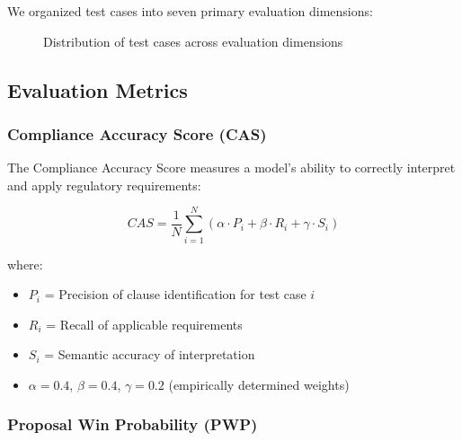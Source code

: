 \documentclass[11pt,a4paper]{article}
\begin{document}
We organized test cases into seven primary evaluation dimensions:

\begin{figure}[H]
\centering
{}
\caption{Distribution of test cases across evaluation dimensions}
\label{fig:testdist}
\end{figure}

\subsection{Evaluation Metrics}

\subsubsection{Compliance Accuracy Score (CAS)}

The Compliance Accuracy Score measures a model's ability to correctly interpret and apply regulatory requirements:

\begin{equation}
CAS = \frac{1}{N} \sum_{i=1}^{N} \left( \alpha \cdot P_i + \beta \cdot R_i + \gamma \cdot S_i \right)
\end{equation}

where:
\begin{itemize}
    \item $P_i$ = Precision of clause identification for test case $i$
    \item $R_i$ = Recall of applicable requirements
    \item $S_i$ = Semantic accuracy of interpretation
    \item $\alpha = 0.4$, $\beta = 0.4$, $\gamma = 0.2$ (empirically determined weights)
\end{itemize}

\subsubsection{Proposal Win Probability (PWP)}
\end{document}
